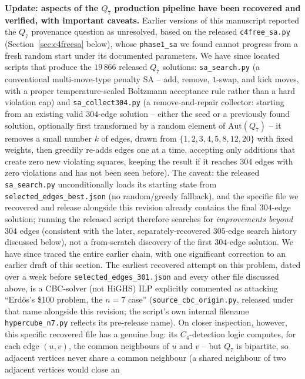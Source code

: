 \documentclass[12pt,a4paper]{article}
\theoremstyle{definition}
\begin{document}
\noindent\textbf{Update: aspects of the $Q_7$ production pipeline have been
recovered and verified, with important caveats.} Earlier versions of this manuscript reported the $Q_7$
provenance question as unresolved, based on the released
\texttt{c4free\_sa.py} (Section~\ref{sec:c4freesa} below), whose
\texttt{phase1\_sa} we found cannot progress from a fresh random start
under its documented parameters. We have since located scripts
that produce the $19\,866$ released $Q_7$ solutions:
\texttt{sa\_search.py} (a conventional multi-move-type penalty SA --
add, remove, $1$-swap, and kick moves, with a proper temperature-scaled
Boltzmann acceptance rule rather than a hard violation cap) and
\texttt{sa\_collect304.py} (a remove-and-repair collector: starting
from an existing valid $304$-edge solution -- either the seed or a
previously found solution, optionally first transformed by a random
element of $\mathrm{Aut}(Q_7)$ -- it removes a small number $k$ of
edges, drawn from $\{1,2,3,4,5,8,12,20\}$ with fixed weights, then
greedily re-adds edges one at a time, accepting only additions that
create zero new violating squares, keeping the result if it reaches
$304$ edges with zero violations and has not been seen before). The
caveat: the released \texttt{sa\_search.py} unconditionally loads its
starting state from \texttt{selected\_edges\_best.json} (no
random/greedy fallback), and the specific file we recovered and
release alongside this revision already contains the final $304$-edge
solution; running the released script therefore searches for
\emph{improvements beyond} $304$ edges (consistent with the later,
separately-recovered $305$-edge search history discussed below), not a
from-scratch discovery of the first $304$-edge solution. We have
since traced the entire earlier chain, with one significant correction to an
earlier draft of this section. The
earliest recovered attempt on this problem, dated
over a week before \texttt{selected\_edges\_301.json} and every other
file discussed above, is a CBC-solver (not HiGHS) ILP explicitly commented as attacking
``Erd\H{o}s's \hbox{\$}100 problem, the $n=7$ case'' (\texttt{source\_cbc\_origin.py},
released under that name alongside this revision; the script's own
internal filename \texttt{hypercube\_n7.py} reflects its pre-release name). On closer inspection, however, this specific
recovered file has a genuine bug: its $C_4$-detection logic computes,
for each edge $(u,v)$, the common neighbours of $u$ and $v$ -- but
$Q_7$ is bipartite, so adjacent vertices never share a common
neighbour (a shared neighbour of two adjacent vertices would close an
\end{document}
